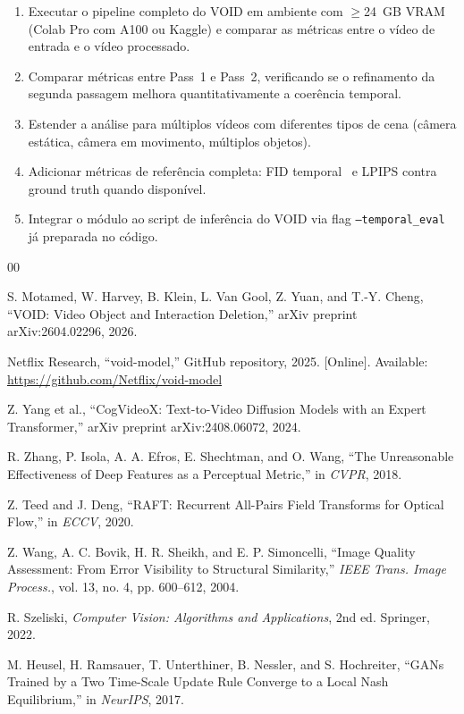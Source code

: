 \documentclass[conference]{IEEEtran}
\begin{document}
\begin{enumerate}
    \item Executar o pipeline completo do VOID em ambiente com $\geq$24~GB VRAM (Colab Pro com A100 ou Kaggle) e comparar as métricas entre o vídeo de entrada e o vídeo processado.
    \item Comparar métricas entre Pass~1 e Pass~2, verificando se o refinamento da segunda passagem melhora quantitativamente a coerência temporal.
    \item Estender a análise para múltiplos vídeos com diferentes tipos de cena (câmera estática, câmera em movimento, múltiplos objetos).
    \item Adicionar métricas de referência completa: FID temporal~\cite{fid} e LPIPS contra ground truth quando disponível.
    \item Integrar o módulo ao script de inferência do VOID via flag \texttt{--temporal\_eval} já preparada no código.
\end{enumerate}

\begin{thebibliography}{00}

S. Motamed, W. Harvey, B. Klein, L. Van Gool, Z. Yuan, and T.-Y. Cheng,
``VOID: Video Object and Interaction Deletion,''
arXiv preprint arXiv:2604.02296, 2026.

Netflix Research,
``void-model,''
GitHub repository, 2025.
[Online]. Available: \url{https://github.com/Netflix/void-model}

Z. Yang et al.,
``CogVideoX: Text-to-Video Diffusion Models with an Expert Transformer,''
arXiv preprint arXiv:2408.06072, 2024.

R. Zhang, P. Isola, A. A. Efros, E. Shechtman, and O. Wang,
``The Unreasonable Effectiveness of Deep Features as a Perceptual Metric,''
in \textit{CVPR}, 2018.

Z. Teed and J. Deng,
``RAFT: Recurrent All-Pairs Field Transforms for Optical Flow,''
in \textit{ECCV}, 2020.

Z. Wang, A. C. Bovik, H. R. Sheikh, and E. P. Simoncelli,
``Image Quality Assessment: From Error Visibility to Structural Similarity,''
\textit{IEEE Trans. Image Process.}, vol. 13, no. 4, pp. 600--612, 2004.

R. Szeliski,
\textit{Computer Vision: Algorithms and Applications}, 2nd ed.
Springer, 2022.

M. Heusel, H. Ramsauer, T. Unterthiner, B. Nessler, and S. Hochreiter,
``GANs Trained by a Two Time-Scale Update Rule Converge to a Local Nash Equilibrium,''
in \textit{NeurIPS}, 2017.

\end{thebibliography}
\end{document}
